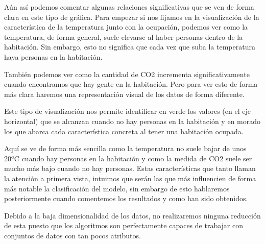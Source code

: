\documentclass{article}
\begin{document}
Aún así podemos comentar algunas relaciones significativas que se ven de forma clara en este tipo de gráfica. Para empezar si nos fijamos en la visualización de la característica de la temperatura junto con la ocupación, podemos ver como la temperatura, de forma general, suele elevarse al haber personas dentro de la habitación. Sin embargo, esto no significa que cada vez que suba la temperatura haya personas en la habitación.

También podemos ver como la cantidad de CO2 incrementa significativamente cuando encontramos que hay gente en la habitación. Pero para ver esto de forma más clara haremos una representación visual de los datos de forma diferente. 
\begin{figure}[H]
    \centering
\end{figure}
Este tipo de visualización nos permite identificar en verde los valores (en el eje horizontal) que se alcanzan cuando no hay personas en la habitación y en morado los que abarca cada característica concreta al tener una habitación ocupada.

Aquí se ve de forma más sencilla como la temperatura no suele bajar de unos 20ºC cuando hay personas en la habitación y como la medida de CO2 suele ser mucho más bajo cuando no hay personas.
Estas características que tanto llaman la atención a primera vista, intuimos que serán las que más influencien de forma más notable la clasificación del modelo, sin embargo de esto hablaremos posteriormente cuando comentemos los resultados y como han sido obtenidos.

\newpage
Debido a la baja dimensionalidad de los datos, no realizaremos ninguna reducción de esta puesto que los algoritmos son perfectamente capaces de trabajar con conjuntos de datos con tan pocos atributos.
\end{document}
